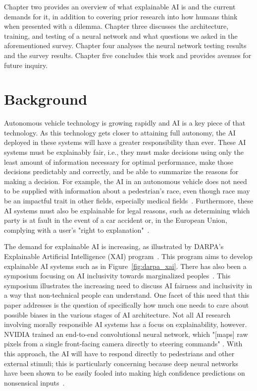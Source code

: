 \documentclass[paper=a4paper]{report}
\begin{document}
Chapter two provides an overview of what explainable AI is and the current demands for it, in
addition to covering prior research into how humans think when presented with a dilemma. Chapter
three discusses the architecture, training, and testing of a neural network and what questions we
asked in the aforementioned survey. Chapter four analyses the neural network testing results and the
survey results. Chapter five concludes this work and provides avenues for future inquiry.


\FloatBarrier
\chapter{Background}

Autonomous vehicle technology is growing rapidly and AI is a key piece of that technology. As this
technology gets closer to attaining full autonomy, the AI deployed in these systems will have a
greater responsibility than ever. These AI systems must be explainably fair, i.e., they must make
decisions using only the least amount of information necessary for optimal performance, make those
decisions predictably and correctly, and be able to summarize the reasons for making a decision. For
example, the AI in an autonomous vehicle does not need to be supplied with information about a
pedestrian's race, even though race may be an impactful trait in other fields, especially medical
fields~\cite{sickeCellDisease}. Furthermore, these AI systems must also be explainable for legal
reasons, such as determining which party is at fault in the event of a car accident or, in the
European Union, complying with a user's "right to explanation"~\cite{goodman2017european}.

The demand for explainable AI is increasing, as illustrated by DARPA's Explainable Artificial
Intelligence (XAI) program~\cite{gunning2016explainable}. This program aims to develop explainable
AI systems such as in Figure~\ref{fig:darpa_xai}. There has also been a symposium focusing on AI
inclusivity towards marginalized peoples~\cite{berkmanKleinCenterAI2017,aiAndInclusionSymposium}.
This symposium illustrates the increasing need to discuss AI fairness and inclusivity in a way that
non-technical people can understand. One facet of this need that this paper addresses is the
question of specifically how much one needs to care about possible biases in the various stages of
AI architecture. Not all AI research involving morally responsible AI systems has a focus on
explainability, however. NVIDIA trained an end-to-end convolutional neural network, which "[maps]
raw pixels from a single front-facing camera directly to steering commands" \cite{bojarski2016end}.
With this approach, the AI will have to respond directly to pedestrians and other external stimuli;
this is particularly concerning because deep neural networks have been shown to be easily fooled
into making high confidence predictions on nonsensical inputs~\cite{nguyen2015fooled}.
\end{document}
